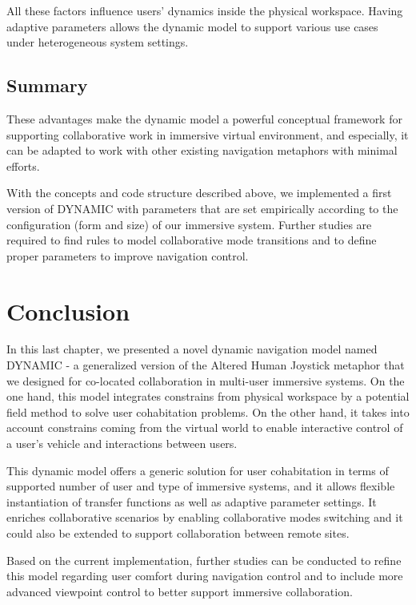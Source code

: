 All these factors influence users' dynamics inside the physical workspace. Having adaptive parameters allows the dynamic model to support various use cases under heterogeneous system settings.

\subsection{Summary}

These advantages make the dynamic model a powerful conceptual framework for supporting collaborative work in immersive virtual environment, and especially, it can be adapted to work with other existing navigation metaphors with minimal efforts.

With the concepts and code structure described above, we implemented a first version of DYNAMIC with parameters that are set empirically according to the configuration (form and size) of our immersive system. Further studies are required to find rules to model collaborative mode transitions and to define proper parameters to improve navigation control.


\section{Conclusion}
In this last chapter, we presented a novel dynamic navigation model named DYNAMIC - a generalized version of the Altered Human Joystick metaphor that we designed for co-located collaboration in multi-user immersive systems. On the one hand, this model integrates constrains from physical workspace by a potential field method to solve user cohabitation problems. On the other hand, it takes into account constrains coming from the virtual world to enable interactive control of a user's vehicle and interactions between users.

This dynamic model offers a generic solution for user cohabitation in terms of supported number of user and type of immersive systems, and it allows flexible instantiation of transfer functions as well as adaptive parameter settings. It enriches collaborative scenarios by enabling collaborative modes switching and it could also be extended to support collaboration between remote sites.

Based on the current implementation, further studies can be conducted to refine this model regarding user comfort during navigation control and to include more advanced viewpoint control to better support immersive collaboration.